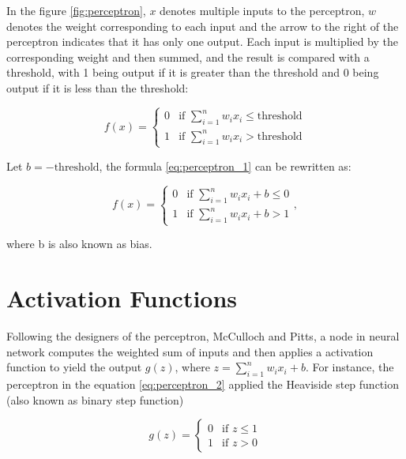 \documentclass[
	parskip, 			   %
	twoside, 			   %
	DIV=14, 			   %
	BCOR=15.0mm, 		   %
	headsepline, 		   %
	open=right, 		   %
	captions=tableheading, %
	bibliography=totoc,    %
	numbers=noenddot       %
]{scrreprt}
\begin{document}
In the figure \ref{fig:perceptron}, $x$ denotes multiple inputs to the perceptron, $w$ denotes the weight corresponding to each input and the arrow to the right of the perceptron indicates that it has only one output. Each input is multiplied by the corresponding weight and then summed, and the result is compared with a threshold, with 1 being output if it is greater than the threshold and 0 being output if it is less than the threshold:

\begin{equation}
    \label{eq:perceptron_1}
    f(x)=\begin{cases}0 & \text{if } \sum\nolimits_{i=1}^n w_{i} x_{i} \leq \text{threshold} \\ 1 & \text{if } \sum\nolimits_{i=1}^n w_{i} x_{i}>\text{threshold}\end{cases}
\end{equation}

Let $b=-\text{threshold}$, the formula \ref{eq:perceptron_1} can be rewritten as:

\begin{equation}
    \label{eq:perceptron_2}
    f(x)=\begin{cases}0 & \text{if } \sum\nolimits_{i=1}^n w_{i} x_{i}+b \leq 0 \\ 1 & \text{if } \sum\nolimits_{i=1}^n w_{i} x_{i}+b>1\end{cases},
\end{equation}

where b is also known as bias. 

\section{Activation Functions}
Following the designers of the perceptron, McCulloch and Pitts, a node in neural network computes the weighted sum of inputs and then applies a activation function to yield the output $g(z)$, where $z=\sum\nolimits_{i=1}^n w_{i} x_{i} + b$. For instance, the perceptron in the equation \ref{eq:perceptron_2} applied the Heaviside step function (also known as binary step function) 

\begin{equation}
    \label{eq:activation_function}
    g(z)=\begin{cases} 0 & \text{if } z\leq 1 \\ 1  & \text{if } z>0
    \end{cases}
\end{equation}
\end{document}
